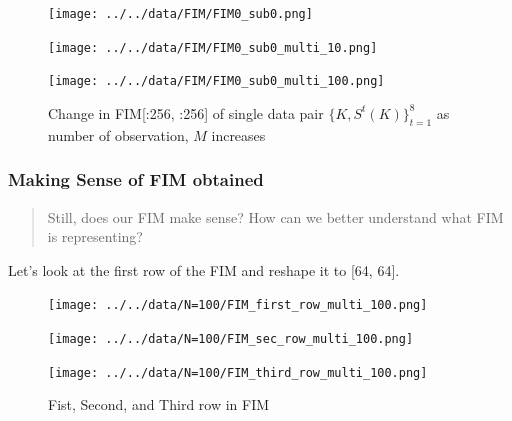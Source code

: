 \documentclass[
]{article}
\begin{document}
\begin{figure}

\begin{minipage}{0.33\linewidth}

\texttt{[image: ../../data/FIM/FIM0\_sub0.png]}

\end{minipage}%
%
\begin{minipage}{0.33\linewidth}

\texttt{[image: ../../data/FIM/FIM0\_sub0\_multi\_10.png]}

\end{minipage}%
%
\begin{minipage}{0.33\linewidth}

\texttt{[image: ../../data/FIM/FIM0\_sub0\_multi\_100.png]}

\end{minipage}%

\caption{\label{fig-fim}Change in FIM{[}:256, :256{]} of single data
pair \(\{K, S^t(K)\}^8_{t=1}\) as number of observation, \(M\)
increases}

\end{figure}%

\subsubsection{Making Sense of FIM
obtained}\label{making-sense-of-fim-obtained}

\begin{quote}
Still, does our FIM make sense? How can we better understand what FIM is
representing?
\end{quote}

Let's look at the first row of the FIM and reshape it to {[}64, 64{]}.

\begin{figure}

\begin{minipage}{0.33\linewidth}

\texttt{[image: ../../data/N=100/FIM\_first\_row\_multi\_100.png]}

\end{minipage}%
%
\begin{minipage}{0.33\linewidth}

\texttt{[image: ../../data/N=100/FIM\_sec\_row\_multi\_100.png]}

\end{minipage}%
%
\begin{minipage}{0.33\linewidth}

\texttt{[image: ../../data/N=100/FIM\_third\_row\_multi\_100.png]}

\end{minipage}%

\caption{\label{fig-fimrow}Fist, Second, and Third row in FIM}

\end{figure}%
\end{document}

